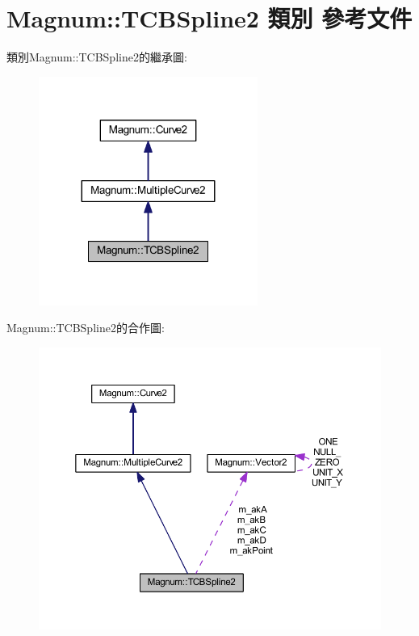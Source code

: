 \hypertarget{class_magnum_1_1_t_c_b_spline2}{}\section{Magnum\+:\+:T\+C\+B\+Spline2 類別 參考文件}
\label{class_magnum_1_1_t_c_b_spline2}


類別\+Magnum\+:\+:T\+C\+B\+Spline2的繼承圖\+:\nopagebreak
\begin{figure}[H]
\begin{center}
\leavevmode
\includegraphics[width=203pt]{class_magnum_1_1_t_c_b_spline2__inherit__graph}
\end{center}
\end{figure}


Magnum\+:\+:T\+C\+B\+Spline2的合作圖\+:\nopagebreak
\begin{figure}[H]
\begin{center}
\leavevmode
\includegraphics[width=350pt]{class_magnum_1_1_t_c_b_spline2__coll__graph}
\end{center}
\end{figure}
